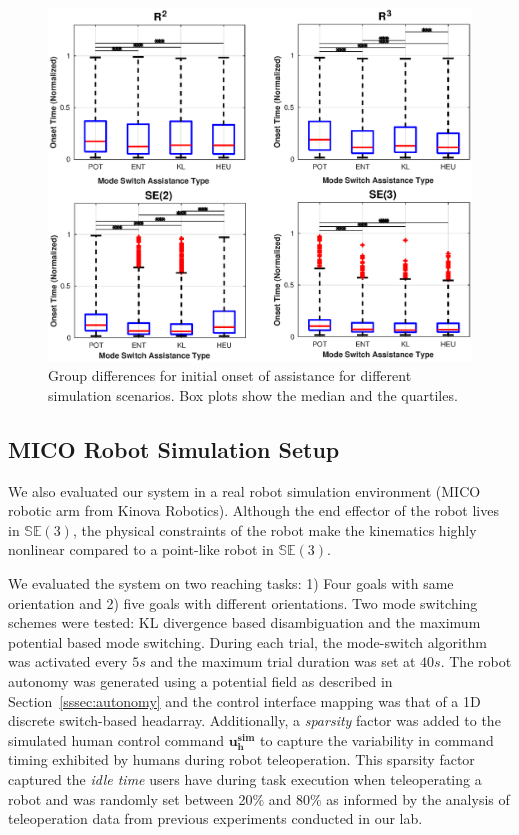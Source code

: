 \documentclass[conference]{IEEEtran}
\begin{document}
 \begin{figure}[t!]
	\centering
	\includegraphics[width= 1.\hsize, height=0.4\vsize]{./figures/initial_alpha.eps}
	\vspace{-0.75cm}
	\caption{Group differences for initial onset of assistance for different simulation scenarios. Box plots show the median and the quartiles.} 
	\label{fig:initial_alpha}
\end{figure}



\subsection{MICO Robot Simulation Setup}
We also evaluated our system in a real robot simulation environment (MICO robotic arm from Kinova Robotics). Although the end effector of the robot lives in $\mathbb{SE}(3)$, the physical constraints of the robot make the kinematics highly nonlinear compared to a point-like robot in $\mathbb{SE}(3)$. 

We evaluated the system on two reaching tasks: 1) Four goals with same orientation and 2) five goals with different orientations. Two mode switching schemes were tested: KL divergence based disambiguation and the maximum potential based mode switching. During each trial, the mode-switch algorithm was activated every $5s$ and the maximum trial duration was set at $40s$. The robot autonomy was generated using a potential field as described in Section~\ref{sssec:autonomy} and the control interface mapping was that of a 1D discrete switch-based headarray.
 Additionally, a \textit{sparsity} factor was added to the simulated human control command $\boldsymbol{u^{sim}_h}$ to capture the variability in command timing exhibited by humans during robot teleoperation. This sparsity factor captured the \textit{idle time} users have during task execution when teleoperating a robot and was randomly set between 20\% and 80\% as informed by the analysis of teleoperation data from previous experiments conducted in our lab. 
\end{document}
